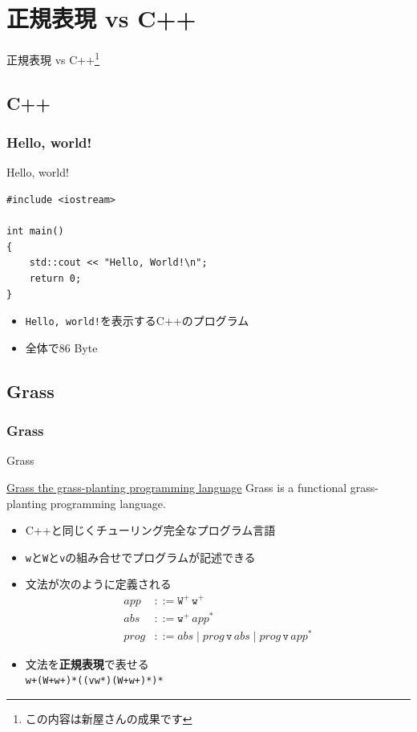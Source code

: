 \documentclass[12pt, unicode, svgnames]{beamer}
\begin{document}
\section{正規表現 vs C++}
\begin{frame}
  \centering
  {\Huge 正規表現 vs C++\footnote[frame]{この内容は新屋さんの成果です}}
\end{frame}

\subsection{C++}
\begin{frame}[fragile]
  \frametitle{Hello, world!}

  \begin{exampleblock}{Hello, world!}
\begin{lstlisting}[style=cpp]
#include <iostream>

int main()
{
    std::cout << "Hello, World!\n";
    return 0;
}
\end{lstlisting}
  \end{exampleblock}

  \begin{itemize}
    \item<2-> \texttt{Hello, world!}を表示するC++のプログラム
    \item<3-> 全体で86 Byte
  \end{itemize}

\end{frame}

\subsection{Grass}
\begin{frame}[fragile]
  \frametitle{Grass}

  \begin{block}{Grass}
    \begin{shadequote}[r]{\scriptsize\href{http://www.blue.sky.or.jp/grass/}{Grass the grass-planting programming language}}
      Grass is a functional grass-planting programming language.
    \end{shadequote}
  \end{block}

  \begin{itemize}
    \item<2-> C++と同じくチューリング完全なプログラム言語
    \item<3-> \texttt{w}と\texttt{W}と\texttt{v}の組み合せでプログラムが記述できる
    \item<4-> 文法が次のように定義される
      \begin{align*}
        app &::= \mathtt{W}^+\, \mathtt{w}^+ \\
        abs &::= \mathtt{w}^+\, app^* \\
        prog &::= abs \mid prog\, \mathtt{v}\, abs \mid prog\, \mathtt{v}\, app^* 
      \end{align*}
    \item<5-> 文法を\textbf{正規表現}で表せる \\
      \lstinline{w+(W+w+)*((vw*)(W+w+)*)*}
  \end{itemize}
\end{frame}
\end{document}
